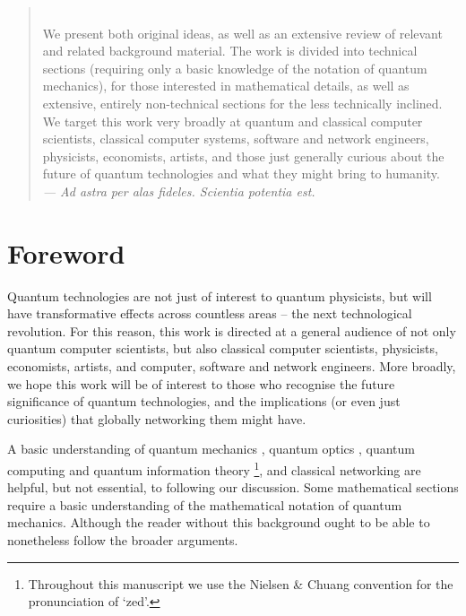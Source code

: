 \documentclass[aps, rmp, twocolumn, amsmath, amssymb, nofootinbib, superscriptaddress, longbibliography, floatfix, table-of-contents, eqsecnum]{revtex4-1}
\begin{document}
\begin{abstract}
\\[4pt]
We present both original ideas, as well as an extensive review of relevant and related background material. The work is divided into technical sections (requiring only a basic knowledge of the notation of quantum mechanics), for those interested in mathematical details, as well as extensive, entirely non-technical sections for the less technically inclined.
\\[4pt]
We target this work very broadly at quantum and classical computer scientists, classical computer systems, software and network engineers, physicists, economists, artists, and those just generally curious about the future of quantum technologies and what they might bring to humanity.
\\[4pt]
\textit{--- Ad astra per alas fideles. Scientia potentia est.}
\newpage
\end{abstract}

%
%

\maketitle

%
%

\makeatletter
\def\l@paragraph{\@dottedtocline{4}{8em}{1.2em}}
\makeatother

\makeatletter
{}
\makeatother

\tableofcontents 
{}

%
%

\section{Foreword}

Quantum technologies are not just of interest to quantum physicists, but will have transformative effects across countless areas -- the next technological revolution. For this reason, this work is directed at a general audience of not only quantum computer scientists, but also classical computer scientists, physicists, economists, artists, and computer, software and network engineers. More broadly, we hope this work will be of interest to those who recognise the future significance of quantum technologies, and the implications (or even just curiosities) that globally networking them might have.

A basic understanding of quantum mechanics \cite{bib:Sakurai94}, quantum optics \cite{bib:GerryKnight05}, quantum computing and quantum information theory \cite{bib:NielsenChuang00}\footnote{Throughout this manuscript we use the Nielsen \& Chuang convention for the pronunciation of `zed'.}, and classical networking \cite{bib:TanenbaumNet} are helpful, but not essential, to following our discussion. Some mathematical sections require a basic understanding of the mathematical notation of quantum mechanics. Although the reader without this background ought to be able to nonetheless follow the broader arguments.
\end{document}
